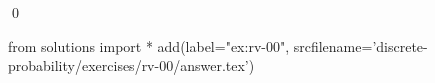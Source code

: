 
\begin{ex} 
  \label{ex:rv-00}
  
  \qed
\end{ex} 
\begin{python0}
from solutions import *
add(label="ex:rv-00",
    srcfilename='discrete-probability/exercises/rv-00/answer.tex') 
\end{python0}
